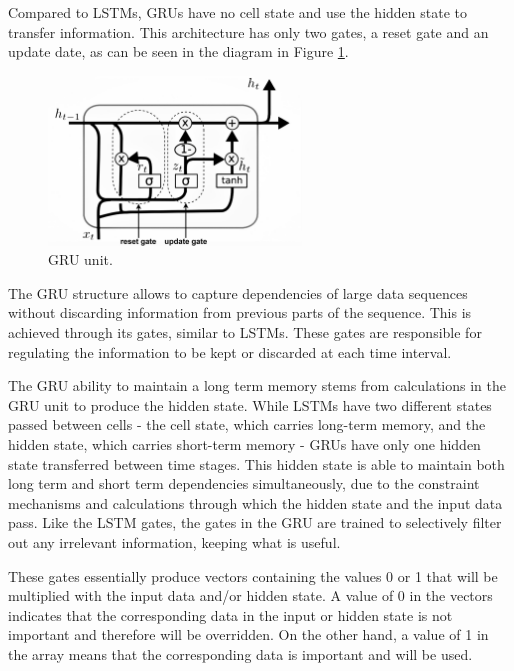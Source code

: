 Compared to \ac{LSTM}s, \ac{GRU}s have no cell state and use the hidden state to transfer information. This architecture has only two gates, a reset gate and an update date, as can be seen in the diagram in Figure \ref{gru}.


\begin{figure}[h!]
    \centering
    \begin{center}
    \includegraphics[width=0.6\textwidth]{Images/GRU_cell_detailed.jpeg}
    \caption{GRU unit.}
    \label{gru}
    \end{center}
\end{figure}


The \ac{GRU} structure allows to capture dependencies of large data sequences without discarding information from previous parts of the sequence. This is achieved through its gates, similar to \ac{LSTM}s. These gates are responsible for regulating the information to be kept or discarded at each time interval.

The \ac{GRU} ability to maintain a long term memory stems from calculations in the \ac{GRU} unit to produce the hidden state. While \ac{LSTM}s have two different states passed between cells - the cell state, which carries long-term memory, and the hidden state, which carries short-term memory - \ac{GRU}s have only one hidden state transferred between time stages. This hidden state is able to maintain both long term and short term dependencies simultaneously, due to the constraint mechanisms and calculations through which the hidden state and the input data pass.  Like the \ac{LSTM} gates, the gates in the \ac{GRU} are trained to selectively filter out any irrelevant information, keeping what is useful.

These gates essentially produce vectors containing the values 0 or 1 that will be multiplied with the input data and/or hidden state. A value of 0 in the vectors indicates that the corresponding data in the input or hidden state is not important and therefore will be overridden. On the other hand, a value of 1 in the array means that the corresponding data is important and will be used.


